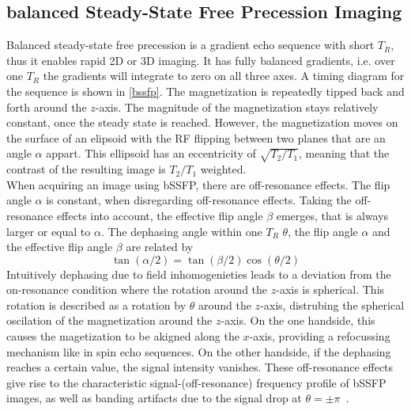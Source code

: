 \subsection{balanced Steady-State Free Precession Imaging}
Balanced steady-state free precession is a gradient echo sequence with short $T_R$, thus it enables rapid 2D or 3D imaging.
It has fully balanced gradients, i.e. over one $T_R$ the gradients will integrate to zero on all three axes.
A timing diagram for the sequence is shown in \ref{bssfp}.
The magnetization is repeatedly tipped back and forth around the $z$-axis.
The magnitude of the magnetization stays relatively constant, once the steady state is reached.
However, the magnetization moves on the surface of an elipsoid with the RF flipping between two planes that are an angle $\alpha$ appart.
This ellipsoid has an eccentricity of $\sqrt{T_2 / T_1}$, meaning that the contrast of the resulting image is $T_2 / T_1$ weighted. \\
When acquiring an image using bSSFP, there are off-resonance effects.
The flip angle $\alpha$ is constant, when disregarding off-resonance effects.
Taking the off-resonance effects into account, the effective flip angle $\beta$ emerges, that is always larger or equal to $\alpha$.
The dephasing angle within one $T_R$ $\theta$, the flip angle $\alpha$ and the effective flip angle $\beta$ are related by
\[ \tan(\alpha / 2) = \tan(\beta / 2) \cos(\theta / 2) \]
Intuitively dephasing due to field inhomogenieties leads to a deviation from the on-resonance condition where the rotation around the $z$-axis is spherical.
This rotation is described as a rotation by $\theta$ around the $z$-axis, distrubing the spherical oscilation of the magnetization around the $z$-axis.
On the one handside, this causes the magetization to be akigned along the $x$-axis, providing a refocussing mechanism like in spin echo sequences.
On the other handside, if the dephasing reaches a certain value, the signal intensity vanishes.
These off-resonance effects give rise to the characteristic signal-(off-resonance) frequency profile of bSSFP images, as well as banding artifacts due to the signal drop at $\theta = \pm \pi$~\autocite{scheffler_principles_2003}.

